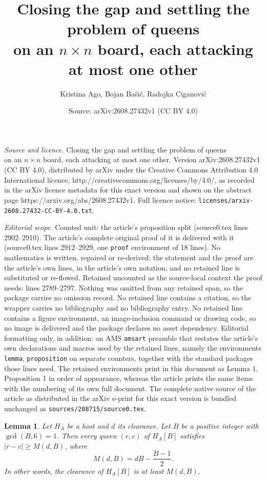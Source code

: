 \documentclass[10pt,a4paper]{amsart}
\title{Closing the gap and settling the problem of queens\\ on an $n\times n$ board, each attacking at most one other}
\author{Kristina Ago, Bojan Ba\v{s}i\'c, Radojka Ciganovi\'c}
\date{Source: arXiv:2608.27432v1 (CC BY 4.0)}
\newtheorem{lemma}{Lemma}
\begin{document}
\maketitle

\noindent\emph{Source and licence.} Closing the gap and settling the problem of queens\\ on an $n\times n$ board, each attacking at most one other. Version arXiv:2608.27432v1 (CC BY 4.0), distributed by arXiv under the Creative Commons Attribution 4.0 International licence, http://creativecommons.org/licenses/by/4.0/, as recorded in the arXiv licence metadata for this exact version and shown on the abstract page https://arxiv.org/abs/2608.27432v1. Full licence notice: \texttt{licenses/arxiv-2608.27432-CC-BY-4.0.txt}.\par\smallskip

\noindent\textit{Editorial scope.} Counted unit: the article's proposition split (source0.tex lines 2902--2910). The article's complete original proof of it is delivered with it (source0.tex lines 2912--2929, one \texttt{proof} environment of 18 lines). No mathematics is written, repaired or re-derived: the statement and the proof are the article's own lines, in the article's own notation, and no retained line is substituted or re-flowed.  Retained uncounted as the source-local context the proof needs: lines 2789--2797.  Nothing was omitted from any retained span, so the package carries no omission record.  No retained line contains a citation, so the wrapper carries no bibliography and no bibliography entry.  No retained line contains a figure environment, an image-inclusion command or drawing code, so no image is delivered and the package declares no asset dependency.  Editorial formatting only, in addition: an AMS \texttt{amsart} preamble that restates the article's own declarations and macros used by the retained lines, namely the environments \texttt{lemma}, \texttt{proposition} on separate counters, together with the standard packages those lines need.  The retained environments print in this document as Lemma 1, Proposition 1 in order of appearance, whereas the article prints the same items with the numbering of its own full document.  The complete native source of the article as distributed in the arXiv e-print for this exact version is bundled unchanged as \texttt{sources/208715/source0.tex}.
\begin{lemma}
\label{clearance}
Let $H_A$ be a host and $d$ its clearance. Let $B$ be a positive integer with $\gcd(B,6)=1$. Then
every queen $(r,c)$ of $H_A[B]$ satisfies $|r-c|\geqslant M(d,B)$, where
\[
M(d,B)=dB-\frac{B-1}2.
\]
In other words, the clearance of $H_A[B]$ is at least $M(d,B).$
\end{lemma}
\end{document}
